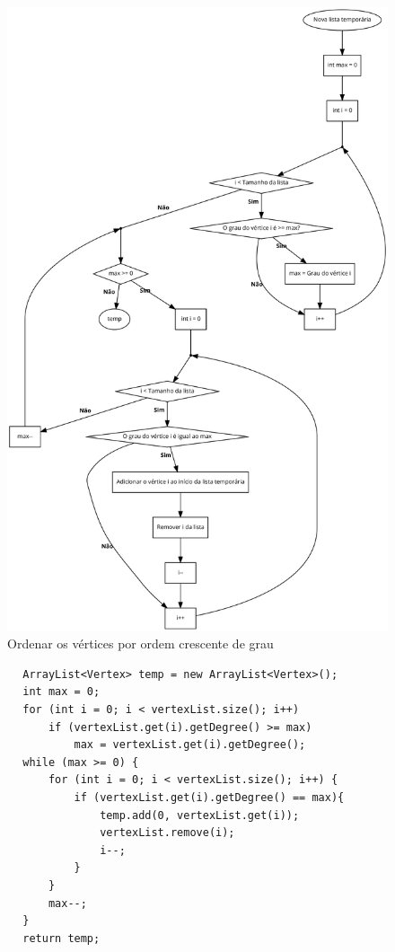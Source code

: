 \documentclass[a4paper,12pt]{report}
\begin{document}
\begin{figure}[H]
    \centering
        \includegraphics[scale=0.18]{img/ordernarVerticesPorGrau.pdf}
    \caption{Ordenar os vértices por ordem crescente de grau}
    \label{fig:ovpg}
\end{figure}

\begin{lstlisting}
        ArrayList<Vertex> temp = new ArrayList<Vertex>();
        int max = 0;
        for (int i = 0; i < vertexList.size(); i++)
            if (vertexList.get(i).getDegree() >= max) 
                max = vertexList.get(i).getDegree();
        while (max >= 0) {
            for (int i = 0; i < vertexList.size(); i++) {
                if (vertexList.get(i).getDegree() == max){
                    temp.add(0, vertexList.get(i));
                    vertexList.remove(i);
                    i--;
                }
            }       
            max--;
        }
        return temp;
\end{lstlisting}
\end{document}
